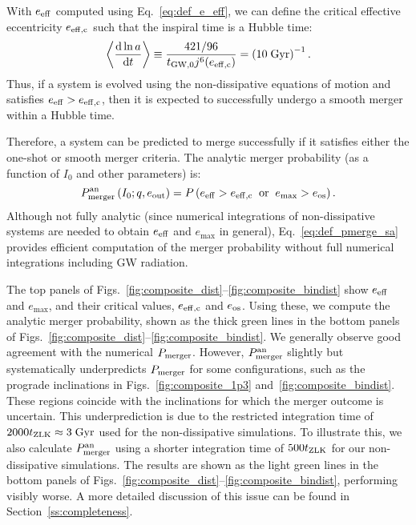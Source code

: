 \documentclass[
        fleqn,
        usenatbib,
    ]{mnras}
\newcommand*{\rd}[2]{\frac{\mathrm{d}#1}{\mathrm{d}#2}}
\newcommand*{\ev}[1]{\left\langle#1\right\rangle}
\newcommand*{\p}[1]{\left(#1\right)}
\begin{document}
With $e_{\rm eff}$ computed using Eq.~\eqref{eq:def_e_eff}, we can define the
critical effective eccentricity $e_{\rm eff, c}$ such that the inspiral time is
a Hubble time:
\begin{equation}
    \ev{\rd{\ln a}{t}} \equiv \frac{421/96}{t_{\rm GW, 0}j^6(e_{\rm eff, c})}
        = \p{10\;\mathrm{Gyr}}^{-1}. \label{eq:def_e_eff_c}
\end{equation}
Thus, if a system is evolved using the non-dissipative equations of motion and
satisfies $e_{\rm eff} > e_{\rm eff, c}$, then it is expected to successfully
undergo a smooth merger within a Hubble time.

Therefore, a system can be predicted to merge successfully if it satisfies either
the one-shot or smooth merger criteria. The analytic merger probability (as a
function of $I_0$ and other parameters) is:
\begin{equation}
    P_{\rm merger}^{\rm an}\p{I_0; q, e_{\rm out}} =
        P\p{e_{\rm eff} > e_{\rm eff, c} \;\;\text{or}\;\;
        e_{\max} > e_{\rm os}}.\label{eq:def_pmerge_sa}
\end{equation}
Although not fully analytic (since numerical integrations of non-dissipative
systems are needed to obtain $e_{\rm eff}$ and $e_{\max}$ in general),
Eq.~\eqref{eq:def_pmerge_sa} provides efficient computation of the merger
probability without full numerical integrations including GW radiation.

The top panels of Figs.~\ref{fig:composite_dist}--\ref{fig:composite_bindist}
show $e_{\rm eff}$ and $e_{\max}$, and their critical values, $e_{\rm eff, c}$
and $e_{\rm os}$. Using these, we compute the analytic merger probability, shown
as the thick green lines in the bottom panels of
Figs.~\ref{fig:composite_dist}--\ref{fig:composite_bindist}. We generally
observe good agreement with the numerical $P_{\rm merger}$. However, $P_{\rm
merger}^{\rm an}$ slightly but systematically underpredicts $P_{\rm merger}$ for
some configurations, such as the prograde inclinations in
Figs.~\ref{fig:composite_1p3} and~\ref{fig:composite_bindist}. These regions
coincide with the inclinations for which the merger outcome is uncertain. This
underprediction is due to the restricted integration time of $2000 t_{\rm ZLK}
\approx 3\;\mathrm{Gyr}$ used for the non-dissipative simulations. To illustrate
this, we also calculate $P_{\rm merger}^{\rm an}$ using a shorter integration
time of $500 t_{\rm ZLK}$ for our non-dissipative simulations. The results are
shown as the light green lines in the bottom panels of
Figs.~\ref{fig:composite_dist}--\ref{fig:composite_bindist}, performing visibly
worse. A more detailed discussion of this issue can be found in
Section~\ref{ss:completeness}.
\end{document}
